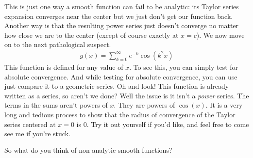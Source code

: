 \documentclass{ximera}
\begin{document}
\begin{exercise}
\begin{exercise}
\begin{exercise}
			This is just one way a smooth function can fail to be analytic: its Taylor series expansion converges near the center but we just don't get our function back. Another way is that the resulting power series just doesn't converge no matter how close we are to the center (except of course exactly at $x=c$). We now move on to the next pathological suspect.
			\begin{align}
				g(x)=\sum_{k=0}^\infty e^{-k}\cos(k^2 x)
			\end{align}
			This function is defined for any value of $x$. To see this, you can simply test for absolute convergence. And while testing for absolute convergence, you can use just compare it to a geometric series. Oh and look! This function is already written as a series, so aren't we done? Well the issue is it isn't a \emph{power} series. The terms in the sums aren't powers of $x$. They are powers of $\cos(x)$. It is a very long and tedious process to show that the radius of convergence of the Taylor series centered at $x=0$ is $0$. Try it out yourself if you'd like, and feel free to come see me if you're stuck.
			
			So what do you think of non-analytic smooth functions?
			\begin{multipleChoice}
			\end{multipleChoice}
		
		\end{exercise}
		
	\end{exercise}
	
\end{exercise}
\end{document}
